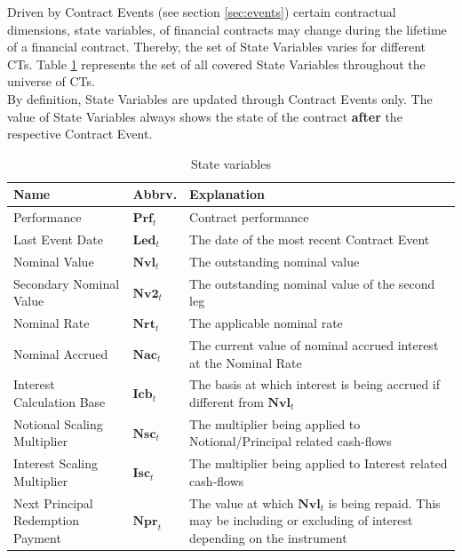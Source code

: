 \documentclass[9pt,oneside]{amsart}
\newcommand{\svar}[2]{\textbf{#1}_{#2}}
\begin{document}
\begin{multicols}{2}
Driven by Contract Events (see section \ref{sec:events}) certain contractual dimensions, state variables, of financial contracts may change during the lifetime of a financial contract. Thereby, the set of State Variables varies for different CTs. Table \ref{tbl:statevars} represents the set of all covered State Variables throughout the universe of CTs.\\

By definition, State Variables are updated through Contract Events only. The value of State Variables always shows the state of the contract \textbf{after} the respective Contract Event.





\begin{table}[H]
	\centering
	\begin{tabular}{| p{0.8in}p{0.4in}p{1.6in} |}
	\hline
	\textbf{Name} & \textbf{Abbrv.} & \textbf{Explanation} \\
	\hline
	Performance & $\svar{Prf}{t}$ & Contract performance \\	
	\hline
	Last Event Date & $\svar{Led}{t}$ & The date of the most recent Contract Event \\
	\hline
	Nominal Value & $\svar{Nvl}{t}$ & The outstanding nominal value \\
	\hline
	Secondary Nominal Value & $\svar{Nv2}{t}$ & The outstanding nominal value of the second leg \\
	\hline
	Nominal Rate & $\svar{Nrt}{t}$ & The applicable nominal rate \\
	\hline
	Nominal Accrued & $\svar{Nac}{t}$ & The current value of nominal accrued interest at the Nominal Rate \\
	\hline
	Interest Calculation Base & $\svar{Icb}{t}$ & The basis at which interest is being accrued if different from $\svar{Nvl}{t}$ \\
	\hline
	Notional Scaling Multiplier & $\svar{Nsc}{t}$ & The multiplier being applied to Notional/Principal related
	cash-flows \\
	\hline
	Interest Scaling Multiplier & $\svar{Isc}{t}$ & The multiplier being applied to Interest related cash-flows \\
	\hline
	Next Principal Redemption Payment & $\svar{Npr}{t}$ & The value at which $\svar{Nvl}{t}$ is being repaid. This may be including or excluding of interest depending on the instrument\\
	\hline
	\end{tabular}
	\caption{State variables}
	\label{tbl:statevars}
\end{table}



\end{multicols}
\end{document}
